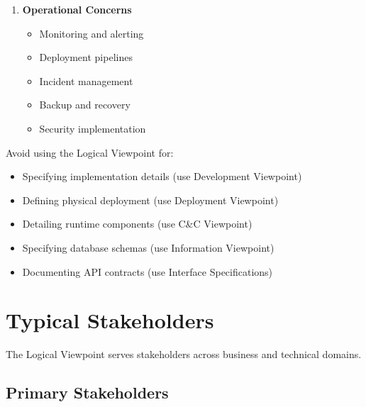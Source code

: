 \documentclass[11pt,letterpaper]{article}
\begin{document}
\begin{enumerate}[label=\textbf{AC\arabic*:}, leftmargin=2.5em]
    \item \textbf{Operational Concerns}
    \begin{itemize}[nosep]
        \item Monitoring and alerting
        \item Deployment pipelines
        \item Incident management
        \item Backup and recovery
        \item Security implementation
    \end{itemize}
\end{enumerate}

\begin{warningbox}
Avoid using the Logical Viewpoint for:

\begin{itemize}[nosep]
    \item Specifying implementation details (use Development Viewpoint)
    \item Defining physical deployment (use Deployment Viewpoint)
    \item Detailing runtime components (use C\&C Viewpoint)
    \item Specifying database schemas (use Information Viewpoint)
    \item Documenting API contracts (use Interface Specifications)
\end{itemize}
\end{warningbox}

\section{Typical Stakeholders}

The Logical Viewpoint serves stakeholders across business and technical domains.

\subsection{Primary Stakeholders}
\end{document}
